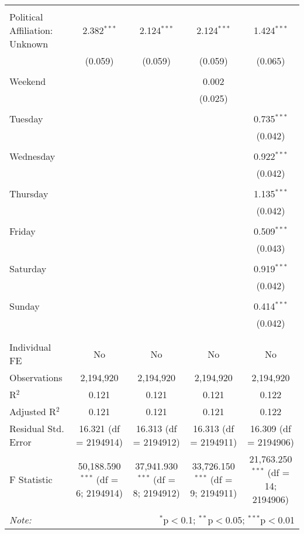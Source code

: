 \documentclass[
]{article}
\begin{document}
\begin{table}[!htbp]
{\begin{tabular}{@{\extracolsep{5pt}}lcccc}
  & & & & \\ 
 Political Affiliation: Unknown & 2.382$^{***}$ & 2.124$^{***}$ & 2.124$^{***}$ & 1.424$^{***}$ \\ 
  & (0.059) & (0.059) & (0.059) & (0.065) \\ 
  & & & & \\ 
 Weekend &  &  & 0.002 &  \\ 
  &  &  & (0.025) &  \\ 
  & & & & \\ 
 Tuesday &  &  &  & 0.735$^{***}$ \\ 
  &  &  &  & (0.042) \\ 
  & & & & \\ 
 Wednesday &  &  &  & 0.922$^{***}$ \\ 
  &  &  &  & (0.042) \\ 
  & & & & \\ 
 Thursday &  &  &  & 1.135$^{***}$ \\ 
  &  &  &  & (0.042) \\ 
  & & & & \\ 
 Friday &  &  &  & 0.509$^{***}$ \\ 
  &  &  &  & (0.043) \\ 
  & & & & \\ 
 Saturday &  &  &  & 0.919$^{***}$ \\ 
  &  &  &  & (0.042) \\ 
  & & & & \\ 
 Sunday &  &  &  & 0.414$^{***}$ \\ 
  &  &  &  & (0.042) \\ 
  & & & & \\ 
\hline \\[-1.8ex] 
Individual FE & No & No & No & No \\ 
Observations & 2,194,920 & 2,194,920 & 2,194,920 & 2,194,920 \\ 
R$^{2}$ & 0.121 & 0.121 & 0.121 & 0.122 \\ 
Adjusted R$^{2}$ & 0.121 & 0.121 & 0.121 & 0.122 \\ 
Residual Std. Error & 16.321 (df = 2194914) & 16.313 (df = 2194912) & 16.313 (df = 2194911) & 16.309 (df = 2194906) \\ 
F Statistic & 50,188.590$^{***}$ (df = 6; 2194914) & 37,941.930$^{***}$ (df = 8; 2194912) & 33,726.150$^{***}$ (df = 9; 2194911) & 21,763.250$^{***}$ (df = 14; 2194906) \\ 
\hline 
\hline \\[-1.8ex] 
\textit{Note:}  & \multicolumn{4}{r}{$^{*}$p$<$0.1; $^{**}$p$<$0.05; $^{***}$p$<$0.01} \\ 
\end{tabular}
} 
\end{table} 
\newpage
\end{document}
